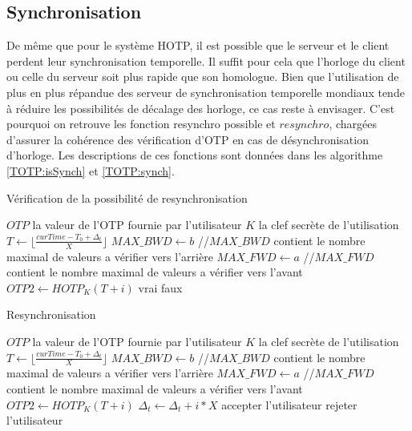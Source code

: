 \documentclass{../res/univ-projet}
\begin{document}
  \subsection{Synchronisation}
  \label{OTP:syncSec}
    De même que pour le système \og{}HOTP\fg{}, il est possible que le serveur et le client perdent leur synchronisation temporelle. Il suffit pour cela que
    l'horloge du client ou celle du serveur soit plus rapide que son homologue. Bien que l'utilisation de plus en plus répandue des serveur de synchronisation 
    temporelle mondiaux tende à réduire les possibilités de décalage des horloge, ce cas reste à envisager. C'est pourquoi on retrouve les fonction \og{}resynchro 
    possible\fg{} et $resynchro$, chargées d'assurer la cohérence des vérification d'OTP en cas de désynchronisation d'horloge. Les descriptions de ces fonctions sont 
    données dans les algorithme \ref{TOTP:isSynch} et \ref{TOTP:synch}.
    \begin{algorithm}
      \caption{Vérification de la possibilité de resynchronisation}
      \label{TOTP:isSynch}
      
      \begin{algorithmic}
	\REQUIRE $OTP$ la valeur de l'OTP fournie par l'utilisateur
	\REQUIRE $K$ la clef secrète de l'utilisation
	\STATE $T \leftarrow \lfloor{}\frac{curTime - T_0 + \Delta_t}{X}\rfloor{}$
	\STATE $MAX\_BWD \leftarrow b$ //$MAX\_BWD$ contient le nombre maximal de valeurs a vérifier vers l'arrière
	\STATE $MAX\_FWD \leftarrow a$ //$MAX\_FWD$ contient le nombre maximal de valeurs a vérifier vers l'avant
	  \STATE $OTP2 \leftarrow HOTP_K(T + i)$
	    \RETURN vrai
	  \ENDIF
	\ENDFOR
	\RETURN faux
      \end{algorithmic}
    \end{algorithm}
    
    \begin{algorithm}
      \caption{Resynchronisation}
      \label{TOTP:synch}
      
      \begin{algorithmic}
	\REQUIRE $OTP$ la valeur de l'OTP fournie par l'utilisateur
	\REQUIRE $K$ la clef secrète de l'utilisation
	\STATE $T \leftarrow \lfloor{}\frac{curTime - T_0 + \Delta_t}{X}\rfloor{}$
	\STATE $MAX\_BWD \leftarrow b$ //$MAX\_BWD$ contient le nombre maximal de valeurs a vérifier vers l'arrière
	\STATE $MAX\_FWD \leftarrow a$ //$MAX\_FWD$ contient le nombre maximal de valeurs a vérifier vers l'avant
	  \STATE $OTP2 \leftarrow HOTP_K(T + i)$
	    \STATE $\Delta_t \leftarrow \Delta_t + i * X$
	    \STATE accepter l'utilisateur
	  \ENDIF
	\ENDFOR
	\STATE rejeter l'utilisateur
      \end{algorithmic}
    \end{algorithm}
    
\end{document}
